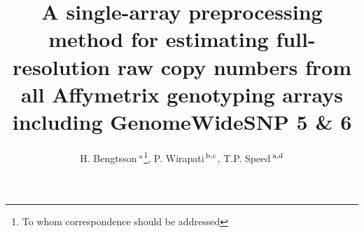 \documentclass{bioinfo}
\begin{document}

\title[CRMA~v2]{A single-array preprocessing method for estimating full-resolution raw copy numbers from all Affymetrix genotyping arrays including GenomeWideSNP 5 \& 6}
\author[Bengtsson \& Speed]{H. Bengtsson\,$^{\rm a}$\footnote{To whom correspondence should be addressed}, P. Wirapati\,$^{\rm b,c}$, T.P. Speed\,$^{\rm a,d}$}
\address{
  $^{\rm a}$ Department of Statistics, University of California, Berkeley, USA.
  $^{\rm b}$ National Center of Competence in Research Molecular Oncology, Swiss Institute of Experimental Cancer Research, Epalinges, Switzerland.
  $^{\rm c}$ Swiss Institute of Bioinformatics, Lausanne, Switzerland.
  $^{\rm d}$ Bioinformatics Division, Walter \& Eliza Hall Institute of Medical Research, Parkville, Australia.
} 



\maketitle
\end{document}
